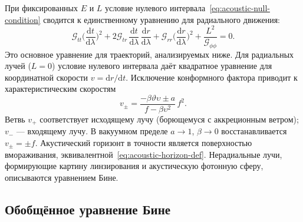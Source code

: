 \documentclass[12pt,a4paper,preprint]{elsarticle}
\begin{document}
            При фиксированных $E$ и $L$ условие нулевого интервала~\eqref{eq:acoustic-null-condition} сводится к единственному уравнению для радиального движения:
            \begin{equation}
                \mathcal{G}_{tt}\Biggl(\frac{\mathrm{d}t}{\mathrm{d}\lambda}\Biggr)^{2} + 2\mathcal{G}_{tr}\,\frac{\mathrm{d}t}{\mathrm{d}\lambda}\,\frac{\mathrm{d}r}{\mathrm{d}\lambda} + \mathcal{G}_{rr}\Biggl(\frac{\mathrm{d}r}{\mathrm{d}\lambda}\Biggr)^{2} + \frac{L^{2}}{\mathcal{G}_{\phi\phi}} = 0 .
                \label{eq:null-interval-expanded}
            \end{equation}
            Это основное уравнение для траекторий, анализируемых ниже. Для радиальных лучей ($L=0$) условие нулевого интервала даёт квадратное уравнение для координатной скорости $v=\mathrm{d}r/\mathrm{d}t$. Исключение конформного фактора приводит к характеристическим скоростям
            \begin{equation}
                v_{\pm} = \frac{-\beta\vartheta\upsilon \pm a}{f - \beta\upsilon^{2}}\, f^{2} .
                \label{eq:coordinate-velocity}
            \end{equation}
            Ветвь $v_{+}$ соответствует исходящему лучу (борющемуся с аккреционным ветром); $v_{-}$ --- входящему лучу. В вакуумном пределе $a\to 1$, $\beta\to 0$ восстанавливается $v_{\pm}=\pm f$. Акустический горизонт в точности является поверхностью вмораживания, эквивалентной~\eqref{eq:acoustic-horizon-def}. Нерадиальные лучи, формирующие картину линзирования и акустическую фотонную сферу, описываются уравнением Бине.

        \subsection{Обобщённое уравнение Бине}\label{subsec:binet-equation}
\end{document}
